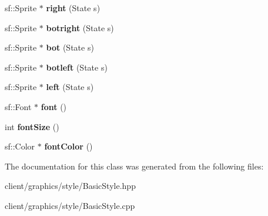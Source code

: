 \begin{DoxyCompactItemize}
\item 
\hypertarget{classgraphics_1_1_basic_style_adaba84c4c1884c68751ad3af94ba7cff}{sf\-::\-Sprite $\ast$ {\bfseries right} (State s)}\label{classgraphics_1_1_basic_style_adaba84c4c1884c68751ad3af94ba7cff}

\item 
\hypertarget{classgraphics_1_1_basic_style_a439fb860d6553af5b4291773fa1dffe7}{sf\-::\-Sprite $\ast$ {\bfseries botright} (State s)}\label{classgraphics_1_1_basic_style_a439fb860d6553af5b4291773fa1dffe7}

\item 
\hypertarget{classgraphics_1_1_basic_style_a7671df9dc0b77bd445576691e3b2ab07}{sf\-::\-Sprite $\ast$ {\bfseries bot} (State s)}\label{classgraphics_1_1_basic_style_a7671df9dc0b77bd445576691e3b2ab07}

\item 
\hypertarget{classgraphics_1_1_basic_style_a0c2158549d197ab9f41a0273c2c06bff}{sf\-::\-Sprite $\ast$ {\bfseries botleft} (State s)}\label{classgraphics_1_1_basic_style_a0c2158549d197ab9f41a0273c2c06bff}

\item 
\hypertarget{classgraphics_1_1_basic_style_a2b91ce5106c5e6d9efc38eb88ba90f46}{sf\-::\-Sprite $\ast$ {\bfseries left} (State s)}\label{classgraphics_1_1_basic_style_a2b91ce5106c5e6d9efc38eb88ba90f46}

\item 
\hypertarget{classgraphics_1_1_basic_style_a050e98ed0cf3cc71b5e21402093afddb}{sf\-::\-Font $\ast$ {\bfseries font} ()}\label{classgraphics_1_1_basic_style_a050e98ed0cf3cc71b5e21402093afddb}

\item 
\hypertarget{classgraphics_1_1_basic_style_aaad746fc1f1ab57609021d9f4d0e57d9}{int {\bfseries font\-Size} ()}\label{classgraphics_1_1_basic_style_aaad746fc1f1ab57609021d9f4d0e57d9}

\item 
\hypertarget{classgraphics_1_1_basic_style_a694c08d113e3666328c0b2ca243db628}{sf\-::\-Color $\ast$ {\bfseries font\-Color} ()}\label{classgraphics_1_1_basic_style_a694c08d113e3666328c0b2ca243db628}

\end{DoxyCompactItemize}


The documentation for this class was generated from the following files\-:\begin{DoxyCompactItemize}
\item 
client/graphics/style/Basic\-Style.\-hpp\item 
client/graphics/style/Basic\-Style.\-cpp\end{DoxyCompactItemize}
